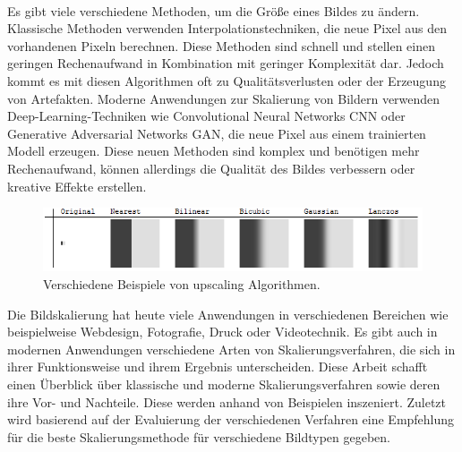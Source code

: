     ~

    Es gibt viele verschiedene Methoden, um die Größe eines Bildes zu ändern.
    Klassische Methoden verwenden Interpolationstechniken, die neue Pixel aus den vorhandenen Pixeln berechnen.
    Diese Methoden sind schnell und stellen einen geringen Rechenaufwand in Kombination mit geringer Komplexität dar.
    Jedoch kommt es mit diesen Algorithmen oft zu Qualitätsverlusten oder der Erzeugung von Artefakten.
    Moderne Anwendungen zur Skalierung von Bildern verwenden Deep-Learning-Techniken wie Convolutional Neural Networks \ac{CNN} oder Generative Adversarial Networks \ac{GAN}, die neue Pixel aus einem trainierten Modell erzeugen.
    Diese neuen Methoden sind komplex und benötigen mehr Rechenaufwand, können allerdings die Qualität des Bildes verbessern oder kreative Effekte erstellen.

    \begin{figure}[h!]
        \vspace{8mm}
        \centering
        \includegraphics{img/xaR8r.png}
        \caption{Verschiedene Beispiele von upscaling Algorithmen\cite{whuber.lanczos}.}
        \label{fig:my_label}
        \vspace{4mm}
    \end{figure}

    Die Bildskalierung hat heute viele Anwendungen in verschiedenen Bereichen wie beispielweise Webdesign, Fotografie, Druck oder Videotechnik.
    Es gibt auch in modernen Anwendungen verschiedene Arten von Skalierungsverfahren, die sich in ihrer Funktionsweise und ihrem Ergebnis unterscheiden.
    Diese Arbeit schafft einen Überblick über klassische und moderne Skalierungsverfahren sowie deren ihre Vor- und Nachteile.
    Diese werden anhand von Beispielen inszeniert.
    Zuletzt wird basierend auf der Evaluierung der verschiedenen Verfahren eine Empfehlung für die beste Skalierungsmethode für verschiedene Bildtypen gegeben.

    ~

